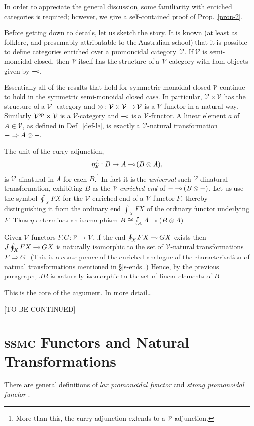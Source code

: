\documentclass{robincs}
\let\origint = \int
\def\int{{\textstyle\origint}}
\newcommand\curry{\mathrm{curry}}
\newcommand\sm    {semi-mon\-oid\-al\xspace}
\newcommand\ssm   {symmetric semi-mon\-oid\-al\xspace}
\newcommand\SEC  {\textsc{ssmc}\xspace}
\begin{document}
In order to appreciate the general discussion, some
familiarity with enriched categories \citep[][ch.~1--2]{KellyEnriched}
is required; however, we give a self-contained proof of
Prop.~\ref{prop-2}.

Before getting down to details, let us sketch the story.
\newcommand\V{\mathcal{V}}%
It is known (at least as folklore, and presumably attributable
to the Australian school) that it is possible to define categories
enriched over a promonoidal category~$\V$. If $\V$ is \sm closed,
then $\V$ itself has the structure of a $\V$-category with hom-objects
given by $\mathbin{\multimap}$.

Essentially all of the results that hold for symmetric monoidal
closed $\V$ continue to hold in the \ssm closed
case. In particular, $\V\times\V$ has the structure of a $\V$-%
category and $\tn:\V\times\V\to\V$ is a $\V$-functor in a natural
way.
%
Similarly $\V\op\times\V$ is a $\V$-category and $\mathbin{\multimap}$ is
a $\V$-functor.
%
A linear element $a$ of $A\in\V$, as defined in Def.~\ref{def-le},
is exactly a $\V$-natural transformation $\mathord- \To A\tn\mathord-$.

The unit of the $\curry$ adjunction,\[
        \eta^A_B: B \to A\lolli(B\tn A),
\]
is $\V$-dinatural in $A$ for each $B$.\footnote{
        More than this, the $\curry$ adjunction extends to a $\V$-adjunction.
}
In fact it is the \emph{universal}
such $\V$-dinatural transformation, exhibiting $B$ as the \emph{$\V$-enriched
end} of $\mathord-\lolli(B\tn\mathord-)$. Let us use the symbol
$\oint_X FX$ for the $\V$-enriched end of a $\V$-functor $F$, thereby
distinguishing it from the ordinary end $\int_X FX$ of the ordinary
functor underlying $F$. Thus $\eta$ determines an isomorphism
$B\cong\oint_AA\lolli(B\tn A)$.

Given $\V$-functors $F$,$G:\V\to\V$, if the end $\oint_XFX\mathbin{\multimap} GX$
exists then $J\oint_XFX\mathbin{\multimap} GX$ is naturally isomorphic to the
set of $\V$-natural transformations $F\Rightarrow G$. 
(This is a consequence of the enriched analogue of the characterisation
of natural transformations mentioned in \S\ref{s-ends}.)
Hence, by the previous paragraph, $JB$ is naturally isomorphic to the
set of linear elements of $B$.

This is the core of the argument. In more detail\dots

[TO BE CONTINUED]

\section{\SEC Functors and Natural Transformations}\label{s-fandnt}
There are general definitions of \emph{lax promonoidal functor}
\citep{DayMonoidalMonads} and \emph{strong promonoidal functor}
\citep{PromonKan}.
\end{document}

